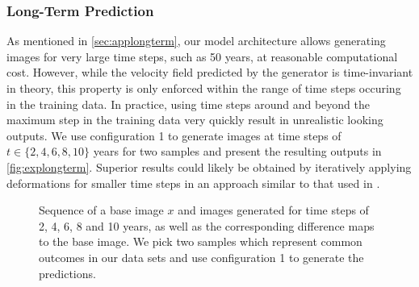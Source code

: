 
\subsubsection*{Long-Term Prediction}
\label{sec:explongterm}
As mentioned in \autoref{sec:applongterm}, our model architecture allows generating images for very large time steps, such as 50 years, at reasonable computational cost. However, while the velocity field predicted by the generator is time-invariant in theory, this property is only enforced within the range of time steps occuring in the training data. In practice, using time steps around and beyond the maximum step in the training data very quickly result in unrealistic looking outputs. We use configuration 1 to generate images at time steps of $t \in \{2, 4, 6, 8, 10\}$ years for two samples and present the resulting outputs in \autoref{fig:explongterm}.
Superior results could likely be obtained by iteratively applying deformations for smaller time steps in an approach similar to that used in \cite{wegmayr2019generative}.

\begin{figure}[h]
	\centering
	
	\vspace{-15pt}
	\caption{Sequence of a base image $x$ and images generated for time steps of 2, 4, 6, 8 and 10 years, as well as the corresponding difference maps to the base image. We pick two samples which represent common outcomes in our data sets and use configuration 1 to generate the predictions.}
	\label{fig:explongterm}
\end{figure}

